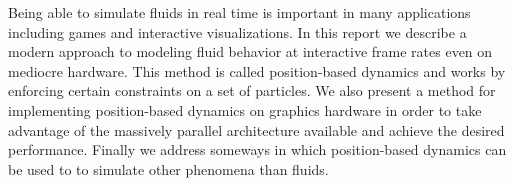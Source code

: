 Being able to simulate fluids in real time is important in many applications
including games and interactive visualizations. In this report we describe a
modern approach to modeling fluid behavior at interactive frame rates even on
mediocre hardware. This method is called position-based dynamics and works by
enforcing certain constraints on a set of particles. We also present a method
for implementing position-based dynamics on graphics hardware in order to take
advantage of the massively parallel architecture available and achieve the
desired performance. Finally we address someways in which position-based
dynamics can be used to to simulate other phenomena than fluids.
